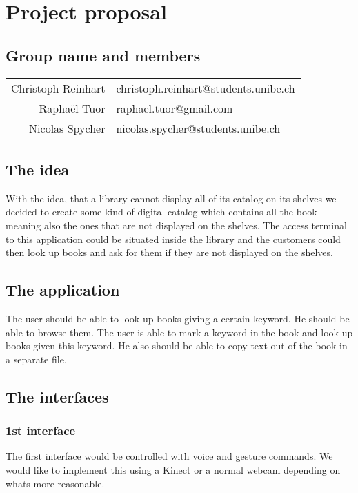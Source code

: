 \documentclass[a4paper, 10pt]{article}
\begin{document}
	\section{Project proposal}
	
	\subsection{Group name and members}	
	
	\begin{tabular}{rl}
		Christoph Reinhart  & christoph.reinhart@students.unibe.ch\\
		Raphaël Tuor  & raphael.tuor@gmail.com\\
		Nicolas Spycher & nicolas.spycher@students.unibe.ch
	\end{tabular}
	
	\subsection{The idea}
	
	\par{With the idea, that a library cannot display all of its catalog on its shelves we decided to create some kind of digital catalog which contains all the book - meaning also the ones that are not displayed on the shelves. The access terminal to this application could be situated inside the library and the customers could then look up books and ask for them if they are not displayed on the shelves.}
	
	\subsection{The application}
	
	\par{The user should be able to look up books giving a certain keyword. He should be able to browse them. The user is able to mark a keyword in the book and look up books given this keyword. He also should be able to copy text out of the book in a separate file.}
	
	\subsection{The interfaces}
	\subsubsection{1st interface}
	\par{The first interface would be controlled with voice and gesture commands. We would like to implement this using a Kinect or a normal webcam depending on whats more reasonable.}
	
\end{document}
